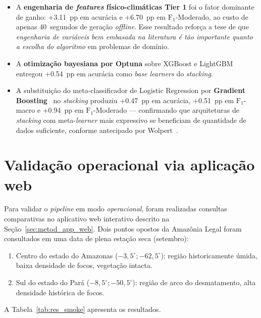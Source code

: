 \begin{itemize}
  \item A \textbf{engenharia de \emph{features} físico-climáticas Tier 1} foi o fator dominante de ganho: +\SI{3,11}{pp} em acurácia e +\SI{6,70}{pp} em \(\text{F}_1\)-Moderado, ao custo de apenas 40~segundos de geração \emph{offline}. Esse resultado reforça a tese de que \emph{engenharia de variáveis bem embasada na literatura é tão importante quanto a escolha do algoritmo} em problemas de domínio.

  \item A \textbf{otimização bayesiana por Optuna} sobre XGBoost e LightGBM~\cite{akiba2019optuna} entregou +\SI{0,54}{pp} em acurácia como \emph{base learners} do \emph{stacking}.

  \item A substituição do meta-classificador de Logistic Regression por \textbf{Gradient Boosting}~\cite{friedman2001greedy} no \emph{stacking} produziu +\SI{0,47}{pp} em acurácia, +\SI{0,51}{pp} em \(\text{F}_1\)-macro e +\SI{0,94}{pp} em \(\text{F}_1\)-Moderado --- confirmando que arquiteturas de \emph{stacking} com meta-\emph{learner} mais expressivo se beneficiam de quantidade de dados suficiente, conforme antecipado por Wolpert~\cite{wolpert1992stacked}.
\end{itemize}

\section{Validação operacional via aplicação web}
\label{sec:res_app}

Para validar o \emph{pipeline} em modo \emph{operacional}, foram realizadas consultas comparativas no aplicativo web interativo descrito na Seção~\ref{sec:metod_app_web}. Dois pontos opostos da Amazônia Legal foram consultados em uma data de plena estação seca (setembro):

\begin{enumerate}
  \item Centro do estado do Amazonas (\(-3{,}5^\circ; -62{,}5^\circ\)): região historicamente úmida, baixa densidade de focos, vegetação intacta.
  \item Sul do estado do Pará (\(-8{,}5^\circ; -50{,}5^\circ\)): região de arco do desmatamento, alta densidade histórica de focos.
\end{enumerate}

A Tabela~\ref{tab:res_smoke} apresenta os resultados.

